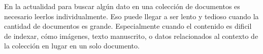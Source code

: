 \documentclass[../main.tex]{subfiles}
\begin{document}

%
%
%



En la actualidad para buscar algún dato en una colección de documentos es necesario leerlos individualmente.
Eso puede llegar a ser lento y tedioso cuando la cantidad de documentos es grande.
Especialmente cuando el contenido es dificil de indexar,
cómo imágenes,
texto manuscrito,
o datos relacionados al contexto de la colección en lugar en un solo documento.
\end{document}

